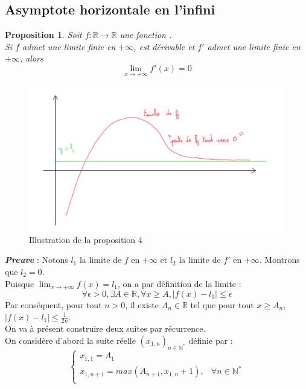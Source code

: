 \documentclass[9pt,a4paper]{article}
\newtheorem{prop}{Proposition}
\begin{document}
\subsection{Asymptote horizontale en l'infini}
\begin{tcolorbox}[colback=green!5!white, colframe=green!50!black]
\begin{prop}
Soit $f : \mathbb{R} \longrightarrow \mathbb{R}$ une fonction .\\
Si $f$ admet une limite finie en $+\infty$, est dérivable et $f'$ admet une limite finie en $+\infty$, alors
$$
\lim_{x\to+\infty} f'(x) = 0
$$
\end{prop}
\end{tcolorbox}
\begin{figure}
  \centering
  \includegraphics[scale=0.2]{illustration_asymptote.png}
  \caption{Illustration de la proposition 4}
  \label{fig:illustration proposition}
\end{figure}
\textbf{\textit{Preuve}} : Notons $l_1$ la limite de $f$ en $+\infty$ et $l_2$ la limite de $f'$ en $+\infty$. Montrons que $l_2 = 0$.\\
Puisque $\lim_{x\to+\infty} f(x) = l_1$, on a par définition de la limite :
$$
\forall \epsilon > 0, \exists A \in \mathbb{R}, \forall x \geq A, |f(x) - l_1| \leq \epsilon
$$
Par conséquent, pour tout $n > 0$, il existe $A_n \in \mathbb{R}$ tel que pour tout $x \geq A_n$, $|f(x) - l_1| \leq \frac{1}{2n}$.\\
On va à présent construire deux suites par récurrence.\\
On considère d'abord la suite réelle $(x_{1, n})_{n \in \mathbb{N}^*}$ définie par :
$$
\left\{
  \begin{array}{lcl}
    x_{1, 1} = A_1 \\
    x_{1, n + 1} = max(A_{n + 1}, x_{1, n} + 1), & \forall n \in \mathbb{N}^* \\
  \end{array}
\right.
$$
\end{document}
